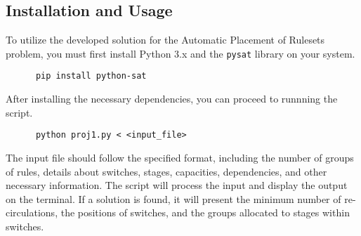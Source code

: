 \subsection{Installation and Usage}

To utilize the developed solution for the Automatic Placement of Rulesets problem, you must first install Python 3.x
and the \texttt{pysat} library on your system.

\begin{verbatim}
      pip install python-sat
\end{verbatim}

After installing the necessary dependencies, you can proceed to runnning the script.

\begin{verbatim}
      python proj1.py < <input_file>
\end{verbatim}

The input file should follow the specified format, including the number of groups of rules, details about switches, stages, capacities, dependencies, and other necessary information. The script will process the input and display the output on the terminal. If a solution is found, it will present the minimum number of re-circulations, the positions of switches, and the groups allocated to stages within switches.